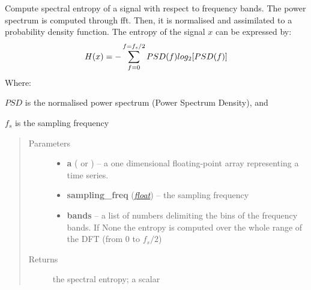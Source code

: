 \documentclass[letterpaper,10pt,english]{sphinxmanual}
\begin{document}
\begin{fulllineitems}
\label{pyrem.univariate:pyrem.univariate.spectral_entropy}
Compute spectral entropy of a  signal with respect to frequency bands.
The power spectrum is computed through fft. Then, it is normalised and assimilated to a probability density function.
The entropy of the signal \(x\) can be expressed by:
\begin{gather}
\begin{split}H(x) =  -\sum_{f=0}^{f = f_s/2} PSD(f) log_2[PSD(f)]\end{split}\notag
\end{gather}
Where:

\(PSD\) is the normalised power spectrum (Power Spectrum Density), and

\(f_s\) is the sampling frequency
\begin{quote}\begin{description}
\item[{Parameters}] \leavevmode\begin{itemize}
\item {} 
\textbf{a} (\href{http://docs.scipy.org/doc/numpy/reference/generated/numpy.ndarray.html\#numpy.ndarray}{} or {\hyperref[pyrem.time_series:pyrem.time_series.Signal]{}}) -- a one dimensional floating-point array representing a time series.

\item {} 
\textbf{sampling\_freq} (\href{http://docs.python.org/2.7/library/functions.html\#float}{\emph{float}}) -- the sampling frequency

\item {} 
\textbf{bands} -- a list of numbers delimiting the bins of the frequency bands. If None the entropy is computed over the whole range of the DFT (from 0 to \(f_s/2\))

\end{itemize}

\item[{Returns}] \leavevmode
the spectral entropy; a scalar

\end{description}\end{quote}

\end{fulllineitems}

\end{document}

